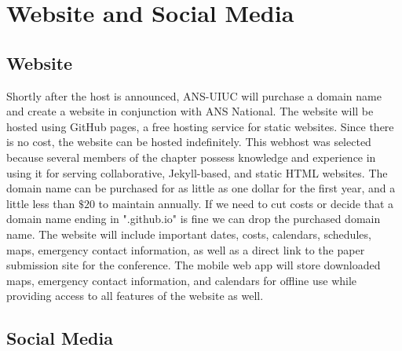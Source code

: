\section{Website and Social Media}
\subsection{Website}
Shortly after the host is announced, ANS-UIUC will purchase a domain name and create a website in conjunction with ANS National. The website will be hosted using GitHub pages, a free hosting service for static websites. Since there is no cost, the website can be hosted indefinitely. This webhost was selected because several members of the chapter possess knowledge and experience in using it for serving collaborative, Jekyll-based, and static HTML websites. The domain name can be purchased for as little as one dollar for the first year, and a little less than $\$20$ to maintain annually. If we need to cut costs or decide that a domain name ending in ".github.io" is fine we can drop the purchased domain name. The website will include important dates, costs, calendars, schedules, maps, emergency contact information, as well as a direct link to the paper submission site for the conference. The mobile web app will store downloaded maps, emergency contact information, and calendars for offline use while providing access to all features of the website as well.

\subsection{Social Media} 
